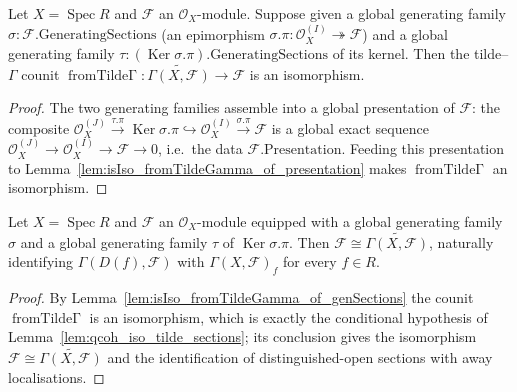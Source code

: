 \begin{lemma}
  \label{lem:isIso_fromTildeGamma_of_genSections}
  Let \(X = \operatorname{Spec} R\) and \(\mathcal{F}\) an \(\mathcal{O}_X\)-module.
  Suppose given a global generating family
  \(\sigma : \mathcal{F}.\mathrm{GeneratingSections}\) (an epimorphism
  \(\sigma.\pi : \mathcal{O}_X^{(I)} \twoheadrightarrow \mathcal{F}\)) and a global
  generating family \(\tau : (\operatorname{Ker} \sigma.\pi).\mathrm{GeneratingSections}\)
  of its kernel. Then the tilde--\(\Gamma\) counit
  \(\operatorname{fromTilde\Gamma} : \widetilde{\Gamma(X, \mathcal{F})} \to \mathcal{F}\)
  is an isomorphism.
\end{lemma}
\begin{proof}
  \leanok
  The two generating families assemble into a global presentation of \(\mathcal{F}\): the
  composite \(\mathcal{O}_X^{(J)} \xrightarrow{\tau.\pi} \operatorname{Ker} \sigma.\pi
  \hookrightarrow \mathcal{O}_X^{(I)} \xrightarrow{\sigma.\pi} \mathcal{F}\) is a global
  exact sequence \(\mathcal{O}_X^{(J)} \to \mathcal{O}_X^{(I)} \to \mathcal{F} \to 0\),
  i.e.\ the data \(\mathcal{F}.\mathrm{Presentation}\). Feeding this presentation to
  Lemma~\ref{lem:isIso_fromTildeGamma_of_presentation} makes
  \(\operatorname{fromTilde\Gamma}\) an isomorphism.
\end{proof}

\begin{lemma}
  \label{lem:qcoh_iso_tilde_sections_of_genSections}
  Let \(X = \operatorname{Spec} R\) and \(\mathcal{F}\) an \(\mathcal{O}_X\)-module
  equipped with a global generating family \(\sigma\) and a global generating family
  \(\tau\) of \(\operatorname{Ker} \sigma.\pi\). Then \(\mathcal{F} \cong
  \widetilde{\Gamma(X, \mathcal{F})}\), naturally identifying
  \(\Gamma(D(f), \mathcal{F})\) with \(\Gamma(X, \mathcal{F})_f\) for every \(f \in R\).
\end{lemma}
\begin{proof}
  \leanok
  By Lemma~\ref{lem:isIso_fromTildeGamma_of_genSections} the counit
  \(\operatorname{fromTilde\Gamma}\) is an isomorphism, which is exactly the conditional
  hypothesis of Lemma~\ref{lem:qcoh_iso_tilde_sections}; its conclusion gives the
  isomorphism \(\mathcal{F} \cong \widetilde{\Gamma(X, \mathcal{F})}\) and the
  identification of distinguished-open sections with away localisations.
\end{proof}

